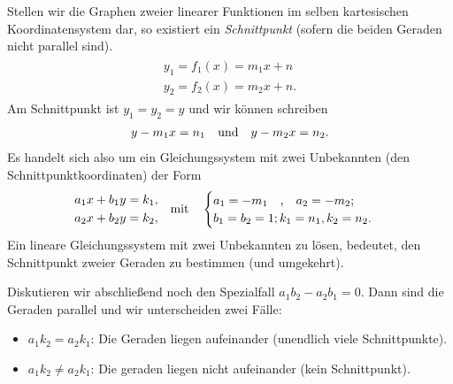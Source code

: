 \begin{wrapfigure}{r}{.5\textwidth}
        \centering
        \vspace{-.5cm}
\end{wrapfigure}
Stellen wir die Graphen zweier linearer Funktionen im selben kartesischen Koordinatensystem dar, so existiert ein \emph{Schnittpunkt} (sofern die beiden Geraden nicht parallel sind).
\begin{align}
    \begin{split}
        y_1 = f_1(x) = m_1 x + n \\
        y_2 = f_2(x) = m_2 x + n.
    \end{split}
\end{align}
Am Schnittpunkt ist $y_1 = y_2 = y$ und wir können schreiben 
\begin{align}
    y - m_1 x = n_1  \qq{und} y - m_2 x = n_2.
\end{align}
Es handelt sich also um ein Gleichungssystem mit zwei Unbekannten (den Schnittpunktkoordinaten) der Form 
\begin{align}
    \begin{split}
        a_1 x + b_1 y &= k_1, \\
        a_2 x + b_2 y &= k_2,
    \end{split} \qq{mit} \begin{cases}
        a_1 = -m_1\qq{,} a_2 = -m_2; \\
        b_1 = b_2 = 1; k_1 = n_1, k_2 = n_2.
    \end{cases}
\end{align}
Ein lineare Gleichungssystem mit zwei Unbekannten zu lösen, bedeutet, den Schnittpunkt zweier Geraden zu bestimmen (und umgekehrt).

Diskutieren wir abschließend noch den Spezialfall $a_1 b_2 - a_2 b_1 = 0$. Dann sind die Geraden parallel und wir unterscheiden zwei Fälle: 
\begin{itemize}
    \item $a_1 k_2 = a_2 k_1$: Die Geraden liegen aufeinander (unendlich viele Schnittpunkte).
    \item $a_1 k_2 \neq a_2 k_1$: Die geraden liegen nicht aufeinander (kein Schnittpunkt).
\end{itemize}

